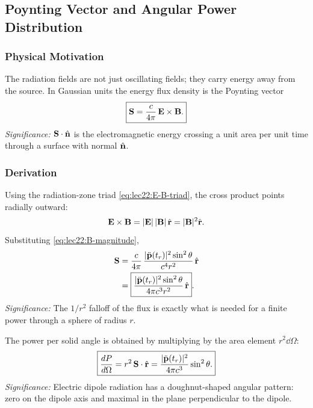 \subsection{Poynting Vector and Angular Power Distribution}
\label{subsec:lec22:poynting}

\subsubsection*{Physical Motivation}
The radiation fields are not just oscillating fields; they carry energy away from the
source. In Gaussian units the energy flux density is the Poynting vector
\begin{equation}\label{eq:lec22:poynting-definition}
  \boxed{\mathbf{S}=\frac{c}{4\pi}\,\mathbf{E}\times\mathbf{B}.}
\end{equation}
\textit{Significance:} $\mathbf{S}\cdot\hat{\mathbf{n}}$ is the electromagnetic energy crossing a
unit area per unit time through a surface with normal $\hat{\mathbf{n}}$.

\subsubsection*{Derivation}
Using the radiation-zone triad \eqref{eq:lec22:E-B-triad}, the cross product points
radially outward:
\begin{equation}\label{eq:lec22:S-direction}
  \mathbf{E}\times\mathbf{B} = |\mathbf{E}|\,|\mathbf{B}|\,\hat{\mathbf{r}}=|\mathbf{B}|^2\hat{\mathbf{r}}.
\end{equation}
Substituting \eqref{eq:lec22:B-magnitude},
\begin{align}
  \mathbf{S}
  &= \frac{c}{4\pi}\,
     \frac{|\ddot{\mathbf{p}}(t_r)|^2\sin^2\theta}{c^4 r^2}\,\hat{\mathbf{r}} \notag\\
  &= \boxed{
     \frac{|\ddot{\mathbf{p}}(t_r)|^2\sin^2\theta}{4\pi c^3 r^2}\,\hat{\mathbf{r}}}.
  \label{eq:lec22:S-dipole}
\end{align}
\textit{Significance:} The $1/r^2$ falloff of the flux is exactly what is needed for a
finite power through a sphere of radius $r$.

The power per solid angle is obtained by multiplying by the area element
$r^2\dd{\Omega}$:
\begin{equation}\label{eq:lec22:angular-power}
  \boxed{\frac{dP}{d\Omega}
  = r^2\,\mathbf{S}\cdot\hat{\mathbf{r}}
  = \frac{|\ddot{\mathbf{p}}(t_r)|^2}{4\pi c^3}\sin^2\theta.}
\end{equation}
\textit{Significance:} Electric dipole radiation has a doughnut-shaped angular pattern:
zero on the dipole axis and maximal in the plane perpendicular to the dipole.

